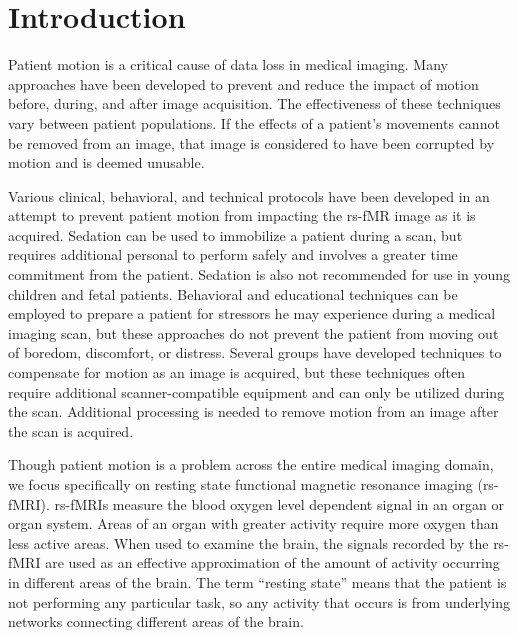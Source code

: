 \chapter{Introduction}
\label{ch:intro}

Patient motion is a critical cause of data loss in medical imaging. Many approaches have been developed to prevent and reduce the impact of motion before, during, and after image acquisition. The effectiveness of these techniques vary between patient populations. If the effects of a patient's movements cannot be removed from an image, that image is considered to have been corrupted by motion and is deemed unusable.

Various clinical, behavioral, and technical protocols have been developed in an attempt to prevent patient motion from impacting the rs-fMR image as it is acquired. Sedation can be used to immobilize a patient during a scan, but requires additional personal to perform safely and involves a greater time commitment from the patient. Sedation is also not recommended for use in young children and fetal patients. Behavioral and educational techniques can be employed to prepare a patient for stressors he may experience during a medical imaging scan, but these approaches do not prevent the patient from moving out of boredom, discomfort, or distress. Several groups have developed techniques to compensate for motion as an image is acquired, but these techniques often require additional scanner-compatible equipment and can only be utilized during the scan. Additional processing is needed to remove motion from an image after the scan is acquired.

Though patient motion is a problem across the entire medical imaging domain, we focus specifically on resting state functional magnetic resonance imaging (rs-fMRI). rs-fMRIs measure the blood oxygen level dependent signal in an organ or organ system. Areas of an organ with greater activity require more oxygen than less active areas. When used to examine the brain, the signals recorded by the rs-fMRI are used as an effective approximation of the amount of activity occurring in different areas of the brain. The term ``resting state'' means that the patient is not performing any particular task, so any activity that occurs is from underlying networks connecting different areas of the brain. 

